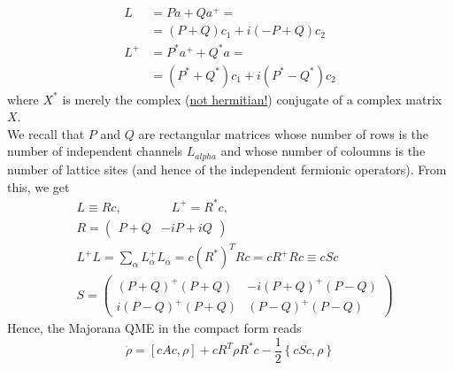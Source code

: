 \documentclass[a4paper,11pt]{article}
\newcommand{\ro}{\rho}
\newcommand{\nl}{\vskip 0.3cm}
\newcommand{\np}{\vskip 1.3cm}
\newcommand{\ubar}[1]{\underline{#1}}
\begin{document}
    \begin{align*}
   L &= P a + Q a^+=\\
     &= (P+Q)c_1 +i(-P+Q)c_2\\
   L^+&= P^*a^++Q^*a=\\
     &= (P^*+Q^*)c_1+i(P^*-Q^*)c_2  
    \end{align*}  
   where $X^*$ is merely the complex (\ubar{not hermitian!}) conjugate of a complex matrix $X$. \\We recall that $P$ and $Q$ are rectangular matrices whose number of rows is the number of independent channels $L_{alpha}$ and whose number of coloumns is the number of lattice sites (and hence of the independent fermionic operators). From this, we get
  \begin{subequations}
  \label{eq:quadr_lindb_majorana}
  \begin{align}
      &L    \equiv Rc, \quad \quad \quad \quad  L^+  = R^*c,\\
      &R = \left(\begin{array}{cc} P+Q & -iP+iQ\end{array}\right) \\[0.3cm]
      &L^+L = \sum_{\alpha} L^+_{\alpha}L^{ }_{\alpha} = c(R^*)^TRc = cR^+Rc \equiv cSc \\
      &S =\left(\begin{array}{cc} (P+Q)^+(P+Q) & -i(P+Q)^+(P-Q)\\i(P-Q)^+(P+Q)&(P-Q)^+(P-Q) \end{array}\right)
  \end{align} 
  \end{subequations}
  \nl Hence, the Majorana QME in the compact form reads
  \begin{equation}
   \label{eq:quadr_dyn_majorana}
   \dot{\ro}=\left[cAc,\ro\right]+cR^T\ro R^*c - \frac{1}{2}\left\{cSc,\ro\right\}
  \end{equation}
  \np
  
\end{document}
